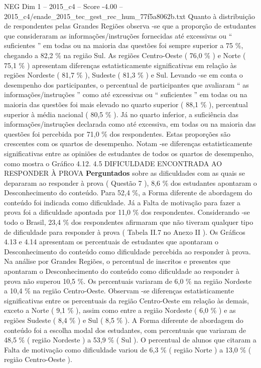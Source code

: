 \begin{textsample}{NEG Dim 1 – 2015\_c4 – Score -4.00 – 2015\_c4/enade\_2015\_tec\_gest\_rec\_hum\_77f5a8062b.txt}
Quanto à distribuição de respondentes pelas Grandes Regiões observa -se que a proporção de estudantes que consideraram as informações/instruções fornecidas até excessivas ou “ suficientes ” em todas ou na maioria das questões foi sempre superior a 75 \%, chegando a 82,2 \% na região Sul.
As regiões Centro-Oeste ( 76,0 \% ) e Norte ( 75,1 \% ) apresentam diferenças estatisticamente significativas em relação às regiões Nordeste ( 81,7 \% ), Sudeste ( 81,3 \% ) e Sul.
Levando -se em conta o desempenho dos participantes, o percentual de participantes que avaliaram “ as informações/instruções ” como até excessivas ou “ suficientes ” em todas ou na maioria das questões foi mais elevado no quarto superior ( 88,1 \% ), percentual superior à média nacional ( 80,5 \% ).
Já no quarto inferior, a suficiência das informações/instruções declarada como até excessiva, em todas ou na maioria das questões foi percebida por 71,0 \% dos respondentes.
Estas proporções são crescentes com os quartos de desempenho.
Notam -se diferenças estatisticamente significativas entre as opiniões de estudantes de todos os quartos de desempenho, como mostra o Gráfico 4.12. 4.5 DIFICULDADE ENCONTRADA AO RESPONDER À PROVA \textbf{Perguntados} sobre as dificuldades com as quais se depararam ao responder à prova ( Questão 7 ), 8,6 \% dos estudantes apontaram o Desconhecimento do conteúdo.
Para 52,4 \%, a Forma diferente de abordagem do conteúdo foi indicada como dificuldade.
Já a Falta de motivação para fazer a prova foi a dificuldade apontada por 11,0 \% dos respondentes.
Considerando -se todo o Brasil, 23,4 \% dos respondentes afirmaram que não tiveram qualquer tipo de dificuldade para responder à prova ( Tabela II.7 no Anexo II ).
Os Gráficos 4.13 e 4.14 apresentam os percentuais de estudantes que apontaram o Desconhecimento do conteúdo como dificuldade percebida ao responder à prova.
Na análise por Grandes Regiões, o percentual de inscritos e presentes que apontaram o Desconhecimento do conteúdo como dificuldade ao responder à prova não superou 10,5 \%.
Os percentuais variaram de 6,0 \% na região Nordeste a 10,4 \% na região Centro-Oeste.
Observam -se diferenças estatisticamente significativas entre os percentuais da região Centro-Oeste em relação às demais, exceto a Norte ( 9,1 \% ), assim como entre a região Nordeste ( 6,0 \% ) e as regiões Sudeste ( 8,4 \% ) e Sul ( 8,5 \% ).
A Forma diferente de abordagem do conteúdo foi a escolha modal dos estudantes, com percentuais que variaram de 48,5 \% ( região Nordeste ) a 53,9 \% ( Sul ).
O percentual de alunos que citaram a Falta de motivação como dificuldade variou de 6,3 \% ( região Norte ) a 13,0 \% ( região Centro-Oeste ).

\end{textsample}
